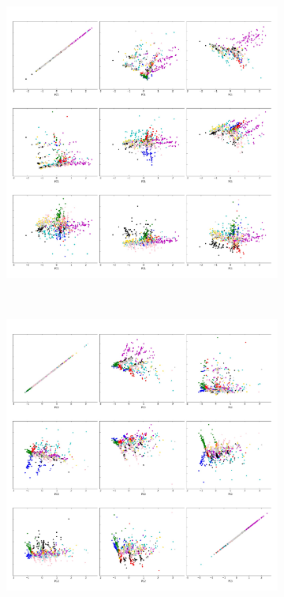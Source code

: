 \begin{figure}[ht!]	
	\begin{subfigure}[b]{0.5\textwidth}
		\includegraphics[width=\linewidth]{img/sanger/9dim-COLLAGE1}
	\end{subfigure}%
	~
	\begin{subfigure}[b]{0.5\textwidth}
		\includegraphics[width=\linewidth]{img/sanger/9dim-COLLAGE2}
	\end{subfigure}%

\end{figure}

